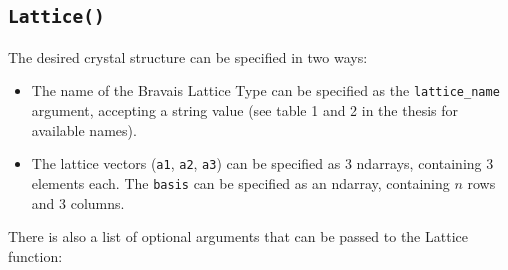 \documentclass[a4paper,11pt]{article}
\numberwithin{equation}{section}
\begin{document}
	\subsection{\texorpdfstring{\texttt{Lattice()}}{Lattice}}
	The desired crystal structure can be specified in two ways:
	\begin{itemize}
		\item The name of the Bravais Lattice Type can be specified as the \texttt{lattice\_name} argument, accepting a string value (see table 1 and 2 in the thesis for available names).
		\item The lattice vectors (\texttt{a1}, \texttt{a2}, \texttt{a3}) can be specified as 3 ndarrays, containing 3 elements each. The \texttt{basis} can be specified as an ndarray, containing $ n $ rows and 3 columns.
	\end{itemize}
	There is also a list of optional arguments that can be passed to the Lattice
	function:
\end{document}
